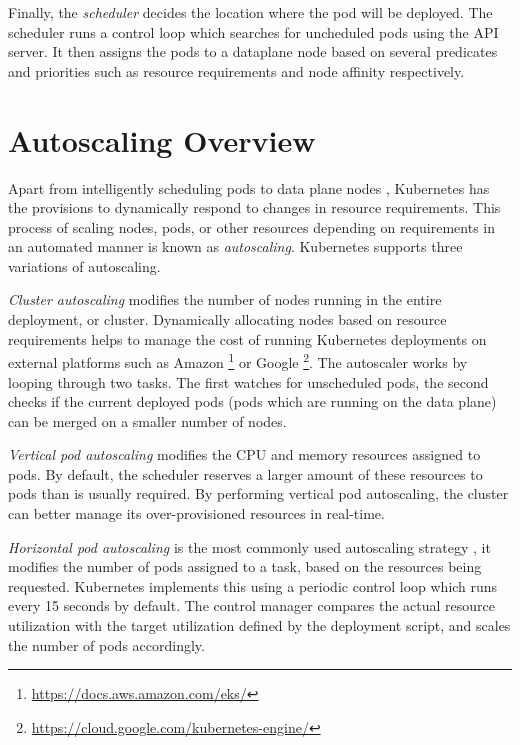 Finally, the \textit{scheduler} decides the location where the pod will be deployed. The scheduler runs a control loop which searches for uncheduled pods using the API server. It then assigns the pods to a dataplane node based on several predicates and priorities such as resource requirements and node affinity respectively.

\section{Autoscaling Overview}
\label{sec:autoscaling}

Apart from intelligently scheduling pods to data plane nodes \cite{kayal2020kubernetes}, Kubernetes has the provisions to dynamically respond to changes in resource requirements. This process of scaling nodes, pods, or other resources depending on requirements in an automated manner is known as \textit{autoscaling}. Kubernetes supports three variations of autoscaling.\par

\textit{Cluster autoscaling} modifies the number of nodes running in the entire deployment, or cluster. Dynamically allocating nodes based on resource requirements helps to manage the cost of running Kubernetes deployments on external platforms such as Amazon \footnote{\url{https://docs.aws.amazon.com/eks/}} or Google \footnote{\url{https://cloud.google.com/kubernetes-engine/}}. The autoscaler works by looping through two tasks. The first watches for unscheduled pods, the second checks if the current deployed pods (pods which are running on the data plane) can be merged on a smaller number of nodes.\par

\textit{Vertical pod autoscaling} modifies the CPU and memory resources assigned to pods. By default, the scheduler reserves a larger amount of these resources to pods than is usually required. By performing vertical pod autoscaling, the cluster can better manage its over-provisioned resources in real-time.\par

\textit{Horizontal pod autoscaling} is the most commonly used autoscaling strategy \cite{baresi2021kosmos}, it modifies the number of pods assigned to a task, based on the resources being requested. Kubernetes implements this using a periodic control loop which runs every 15 seconds by default. The control manager compares the actual resource utilization with the target utilization defined by the deployment script, and scales the number of pods accordingly.

